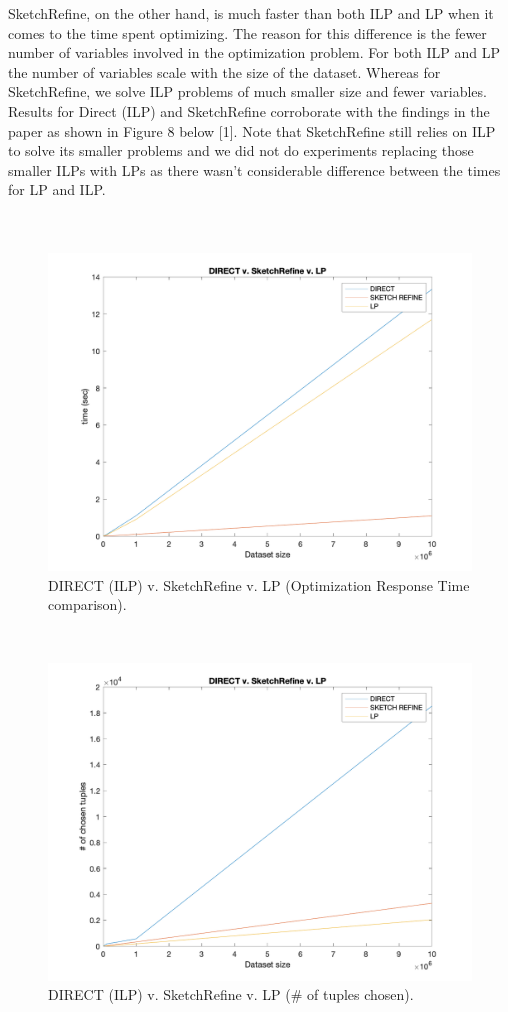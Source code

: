 \documentclass[a4paper,12pt]{article}
\begin{document}
SketchRefine, on the other hand, is much faster than both ILP and LP when it comes to the time spent optimizing. The reason for this difference is the fewer number of variables involved in the optimization problem. For both ILP and LP the number of variables scale with the size of the dataset. Whereas for SketchRefine, we solve ILP problems of much smaller size and fewer variables. Results for Direct (ILP) and SketchRefine corroborate with the findings in the paper as shown in Figure 8 below [1]. Note that SketchRefine still relies on ILP to solve its smaller problems and we did not do experiments replacing those smaller ILPs with LPs as there wasn't considerable difference between the times for LP and ILP.
\\\\\\

\begin{figure}[h]
\includegraphics[scale=.4]{6.png}
\caption{DIRECT (ILP) v. SketchRefine v. LP (Optimization Response Time comparison).}
\centering
\end{figure}
\\
\begin{figure}[h]
\includegraphics[scale=.4]{7.png}
\caption{DIRECT (ILP) v. SketchRefine v. LP (\# of tuples chosen).}
\centering
\end{figure}
\\
\end{document}
